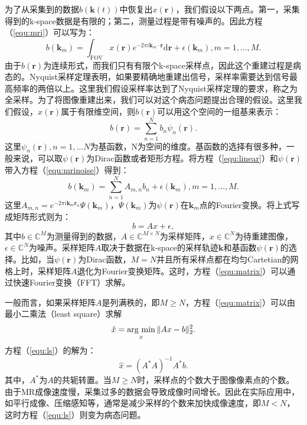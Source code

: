 为了从采集到的数据$b(\mathrm{\textbf{k}}(t))$中恢复出$x(\mathrm{\textbf{r}})$，我们假设以下两点。第一，采集得到的k-space数据是有限的；第二，测量过程是带有噪声的。因此方程（\ref{equ:mri}）可以写为：
\begin{equation}
	b(\mathrm{\textbf{k}}_m) = \int_{\mathrm{FOV}} x(\textbf{r})e^{-2\pi i \mathrm{\textbf{k}}_m \cdot \mathrm{\textbf{r}}}\mathrm{d}\mathrm{\textbf{r}} + \epsilon(\mathrm{\textbf{k}}_m), m=1,...,M.
	\label{equ:mrinoise}
\end{equation}
由于$b(\mathrm{\textbf{r}})$为连续形式，而我们只有有限个k-space采样点，因此这个重建过程是病态的。Nyquist采样定理表明，如果要精确地重建出信号，采样率需要达到信号最高频率的两倍以上。这里我们假设采样率达到了Nyquist采样定理的要求，称之为全采样。为了将图像重建出来，我们可以对这个病态问题提出合理的假设。这里我们假设，$x(\mathrm{\textbf{r}})$属于有限维空间，则$b(\mathrm{\textbf{r}})$可以用这个空间的一组基来表示：
\begin{equation}
	b(\mathrm{\textbf{r}})=\sum_{n=1}^N b_n\psi_n(\mathrm{\textbf{r}}).
	\label{equ:linear}
\end{equation}
这里$\psi_{n}(\mathrm{\textbf{r}}), n=1,...N$为基函数，N为空间的维度。基函数的选择有很多种，一般来说，可以取$\psi(\mathrm{\textbf{r}})$为Dirac函数或者矩形方程。将方程（\ref{equ:linear}）和$\psi(\mathrm{\textbf{r}})$带入方程（\ref{equ:mrinoise}）得到：
\begin{equation}
	b(\mathrm{\textbf{k}}_m) = \sum_{n=1}^N A_{m,n}b_n + \epsilon(\mathrm{\textbf{k}}_m), m=1,...,M.
\end{equation}
这里$A_{m,n}=e^{-2\pi i\mathrm{\textbf{k}}_m\mathrm{\textbf{r}}_n}\Psi(\mathrm{\textbf{k}}_m)$，$\Psi(\mathrm{\textbf{k}}_m)$为$\psi(\mathrm{\textbf{r}})$在$\mathrm{\textbf{k}}_m$点的Fourier变换。将上式写成矩阵形式则为：
\begin{equation}
	b=Ax+\epsilon,
	\label{equ:matrix}
\end{equation}
其中$b\in \mathbb{C}^M$为测量得到的数据，$A\in \mathbb{C}^{M\times N}$为采样矩阵，$x\in \mathbb{C}^N$为待重建图像，$\epsilon \in \mathbb{C}^N$为噪声。采样矩阵$A$取决于数据在k-space的采样轨迹$\mathrm{\textbf{k}}$和基函数$\psi(\mathrm{\textbf{r}})$的选择。比如，当$\psi(\mathrm{\textbf{r}})$为Dirac函数，$M=N$并且所有采样点都在均匀Cartetian的网格上时，采样矩阵$A$退化为Fourier变换矩阵。这时，方程（\ref{equ:matrix}）可以通过快速Fourier变换（FFT）求解。

一般而言，如果采样矩阵$A$是列满秩的，即$M\geq N$，方程（\ref{equ:matrix}）可以由最小二乘法（least square）求解
\begin{equation}
	\hat{x} = \argmin_x \|Ax-b\|^2_2.
	\label{equ:ls}
\end{equation}
方程（\ref{equ:ls}）的解为：
\begin{equation}
	\hat{x} = (A^*A)^{-1}A^*b.
	\label{equ:lss}
\end{equation}
其中，$A^*$为$A$的共轭转置。当$M\geq N$时，采样点的个数大于图像像素点的个数。由于MR成像速度慢，采集过多的数据会导致成像时间增长。因此在实际应用中，如平行成像、压缩感知等，通常是减少采样的个数来加快成像速度，即$M<N$，这时方程（\ref{equ:ls}）则变为病态问题。

